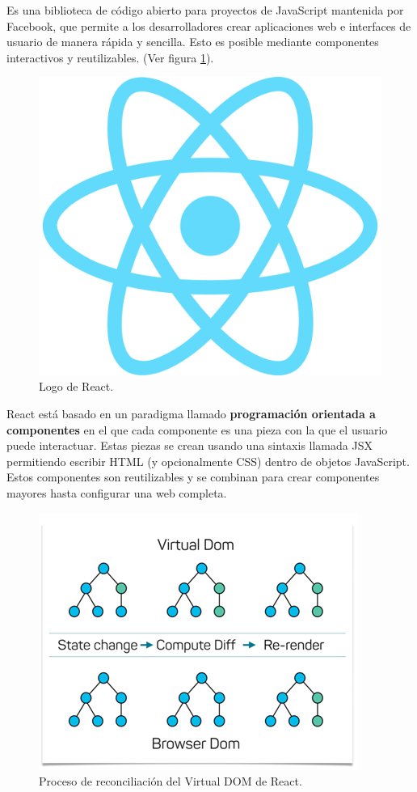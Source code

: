 \documentclass[12pt,twoside,titlepage]{report}
\begin{document}
Es una biblioteca de código abierto para proyectos de JavaScript mantenida por Facebook, que permite a los desarrolladores crear aplicaciones web e interfaces de usuario de manera rápida y sencilla. Esto es posible mediante componentes interactivos y reutilizables.
(Ver figura \ref{fig:ReactLogo}).

\begin{figure}[H]
    \centering
    \includegraphics[scale=0.07]{React/React}
    \caption{Logo de React.}
    \label{fig:ReactLogo}
\end{figure}

React está basado en un paradigma llamado \textbf{programación orientada a componentes} en el que cada componente es una pieza con la que el usuario puede interactuar. Estas piezas se crean usando una sintaxis llamada JSX permitiendo escribir HTML (y opcionalmente CSS) dentro de objetos JavaScript. Estos componentes son reutilizables y se combinan para crear componentes mayores hasta configurar una web completa.

\begin{figure}[H]
    \centering
    \includegraphics[scale=0.5]{React/VirtualDOM1}
    \caption{Proceso de reconciliación del Virtual DOM de React.}
    \label{fig:React_VirtualDom}
\end{figure}
\end{document}
